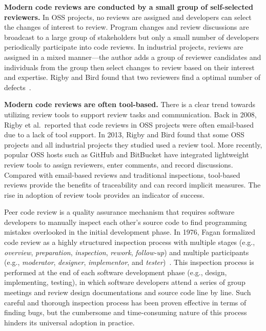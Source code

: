 \documentclass[runningheads,a4paper]{llncs}
\begin{document}
{\bf Modern code reviews are conducted by a small group of self-selected reviewers.} 
In OSS projects, no reviews are assigned and developers can select the changes of interest to review. Program changes and review discussions are broadcast to a large group of stakeholders but only a small number of developers periodically participate into code reviews. In industrial projects, reviews are assigned in a mixed manner---the author adds a group of reviewer candidates and individuals from the group then select changes to review based on their interest and expertise. Rigby and Bird found that two reviewers find a optimal number of defects~\cite{rigby2013convergent}.

{\bf Modern code reviews are often tool-based.} There is a clear trend towards utilizing review tools to support review tasks and communication. Back in 2008, Rigby et al.~reported that code reviews in OSS projects were often email-based due to a lack of tool support. In 2013, Rigby and Bird found that some OSS projects and all industrial projects they studied used a review tool. More recently, popular OSS hosts such as GitHub and BitBucket have integrated lightweight review tools to assign reviewers, enter comments, and record discussions. Compared with email-based reviews and traditional inspections, tool-based reviews provide the benefits of traceability and can record implicit measures. The rise in adoption of review tools provides an indicator of success.



Peer code review is a quality assurance mechanism that requires software developers to manually inspect each other's source code to find programming mistakes overlooked in the initial development phase. In 1976, Fagan formalized code review as a highly structured inspection process with multiple stages (e.g., {\em overview}, {\em preparation}, {\em inspection}, {\em rework}, {\em follow-up}) and multiple participants (e.g., {\em moderator}, {\em designer}, {\em implementor}, and {\em tester})~\cite{fagan2001design}.
This inspection process is performed at the end of each software development phase (e.g., design, implementing, testing), in which software developers attend a series of group meetings and review design documentations and source code line by line. Such careful and thorough inspection process has been proven effective in terms of finding bugs, but the cumbersome and time-consuming nature of this process hinders its universal adoption in practice. 
\end{document}
